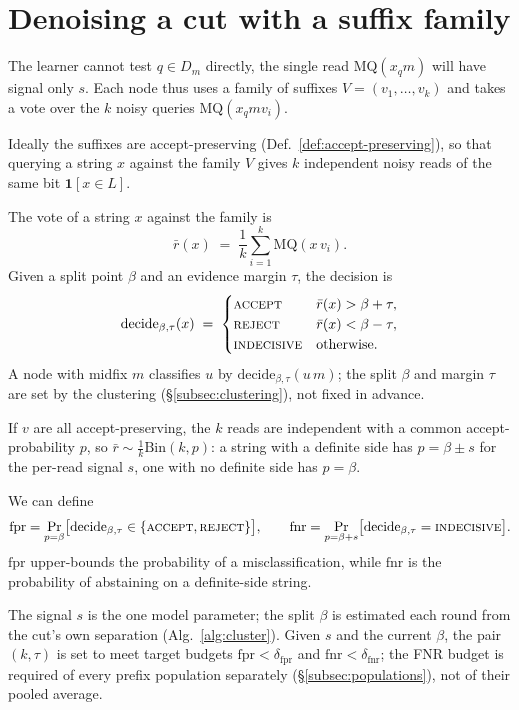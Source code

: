 \section{Denoising a cut with a suffix family}

The learner cannot test $q\in D_m$ directly, the single read $\mathrm{MQ}(x_q m)$ will have
signal only $s$. Each node thus uses a family of suffixes $V=(v_1,\dots,v_k)$ and
takes a vote over the $k$ noisy queries $\mathrm{MQ}(x_q m v_i)$.

Ideally the suffixes are accept-preserving (Def.~\ref{def:accept-preserving}), so
that querying a string $x$ against the family $V$ gives $k$ independent noisy reads
of the same bit $\mathbf 1[x\in L]$.

\begin{definition}\label{def:decide}
The vote of a string $x$ against the family is
\[
  \bar r(x)\;=\;\frac1k\sum_{i=1}^k \mathrm{MQ}(x\,v_i).
\]
Given a split point $\beta$ and an evidence margin $\tau$, the decision is
\[
  \mathrm{decide}_{\beta,\tau}(x)\;=\;
  \begin{cases}
    \textsc{accept} & \bar r(x)>\beta+\tau,\\
    \textsc{reject} & \bar r(x)<\beta-\tau,\\
    \textsc{indecisive} & \text{otherwise.}
  \end{cases}
\]
A node with midfix $m$ classifies $u$ by $\mathrm{decide}_{\beta,\tau}(u\,m)$; the split
$\beta$ and margin $\tau$ are set by the clustering (\S\ref{subsec:clustering}), not
fixed in advance.
\end{definition}

If $v$ are all accept-preserving, the $k$ reads are independent with a common accept-probability
$p$, so $\bar r\sim\tfrac1k\mathrm{Bin}(k,p)$: a string with a definite side has
$p=\beta\pm s$ for the per-read signal $s$, one with no definite side has $p=\beta$.

\begin{definition}\label{def:fpr-fnr}
We can define
\[
  \mathrm{fpr}=\Pr_{p=\beta}\!\big[\mathrm{decide}_{\beta,\tau}\in\{\textsc{accept},\textsc{reject}\}\big],
  \qquad
  \mathrm{fnr}=\Pr_{p=\beta+s}\!\big[\mathrm{decide}_{\beta,\tau}=\textsc{indecisive}\big].
\]
$\mathrm{fpr}$ upper-bounds the probability of a misclassification, while $\mathrm{fnr}$ is the
probability of abstaining on a definite-side string.
\end{definition}

The signal $s$ is the one model parameter; the split $\beta$ is estimated each round from
the cut's own separation (Alg.~\ref{alg:cluster}). Given $s$ and the current $\beta$, the
pair $(k,\tau)$ is set to meet target budgets $\mathrm{fpr}<\delta_{\mathrm{fpr}}$ and
$\mathrm{fnr}<\delta_{\mathrm{fnr}}$; the FNR budget is required of every prefix population
separately (\S\ref{subsec:populations}), not of their pooled average.

